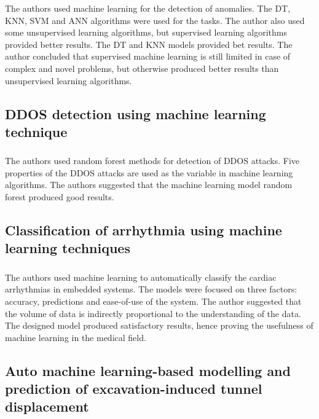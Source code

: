 The authors used machine learning for the detection of anomalies. The DT, KNN, SVM and ANN algorithms were used for the tasks. The author also used some unsupervised learning algorithms, but supervised learning algorithms provided better results. The DT and KNN models provided bet results. The author concluded that supervised machine learning is still limited in case of complex and novel problems, but otherwise produced better results than unsupervised learning algorithms.

\subsection{DDOS detection using machine learning technique}
\subsubsection{\citeauthor*{ref_paper_9} \citeyearpar{ref_paper_9}}

The authors used random forest methods for detection of DDOS attacks. Five properties of the DDOS attacks are used as the variable in machine learning algorithms. The authors suggested that the machine learning model random forest produced good results.

\subsection{Classification of arrhythmia using machine learning techniques}
\subsubsection{\citeauthor*{ref_paper_4} \citeyearpar{ref_paper_4}}

The authors used machine learning to automatically classify the cardiac arrhythmias in embedded systems. The models were focused on three factors: accuracy, predictions and ease-of-use of the system. The author suggested that the volume of data is indirectly proportional to the understanding of the data. The designed model produced satisfactory results, hence proving the usefulness of machine learning in the medical field.

\subsection{Auto machine learning-based modelling and prediction of excavation-induced tunnel displacement}
\subsubsection{\citeauthor*{ref_paper_1} \citeyearpar{ref_paper_1}}

